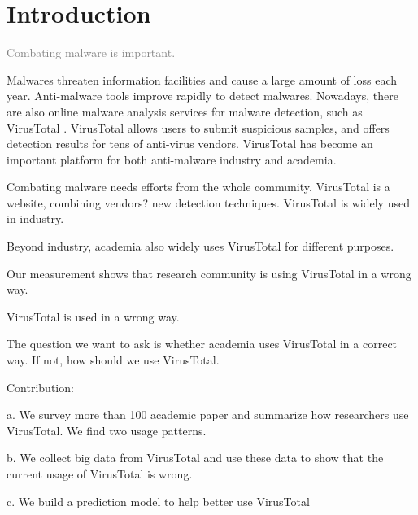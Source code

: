 \section{Introduction}

\textcolor{gray}{Combating malware is important.} 

Malwares threaten information facilities and cause a large amount of loss each year. Anti-malware tools improve rapidly to detect malwares. 
Nowadays, there are also online malware analysis services for malware detection, such as VirusTotal \cite{VirusTot68:online}. 
VirusTotal allows users to submit suspicious samples, and offers detection results for tens of anti-virus vendors.
VirusTotal has become an important platform for both anti-malware industry and academia.

Combating malware needs efforts from the whole community. VirusTotal is a website, combining vendors? new detection techniques. VirusTotal is widely used in industry.

Beyond industry, academia also widely uses VirusTotal for different purposes. 

Our measurement shows that research community is using VirusTotal in a wrong way. 

VirusTotal is used in a wrong way. 

The question we want to ask is whether academia uses VirusTotal in a correct way. If not, how should we use VirusTotal. 

Contribution:

a. We survey more than 100 academic paper and summarize how researchers use VirusTotal. We find two usage patterns.

b. We collect big data from VirusTotal and use these data to show that the current usage of VirusTotal is wrong. 

c. We build a prediction model to help better use VirusTotal


